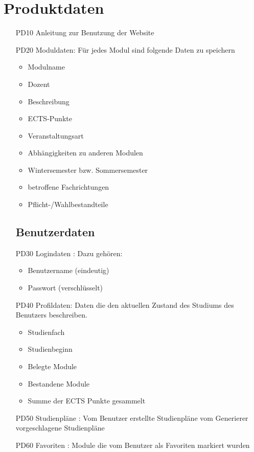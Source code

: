 \section{Produktdaten}
	\begin{itemize}[nosep]
	\subsection{Systemdaten}
	\item[PD10]Anleitung zur Benutzung der 		Website
	\item[PD20]Moduldaten: Für jedes Modul sind folgende Daten zu speichern	
	\begin{itemize}
	\item Modulname
	\item Dozent
	\item Beschreibung
	\item ECTS-Punkte
	\item Veranstaltungsart
	\item Abhängigkeiten zu anderen Modulen
	\item Wintersemester bzw. Sommersemester
	\item betroffene Fachrichtungen 
	\item Pflicht-/Wahlbestandteile
	\end{itemize}	 
	\subsection{Benutzerdaten}
	\item[PD30]Logindaten : Dazu gehören:
		\begin{itemize}
		\item Benutzername (eindeutig)
		\item Passwort (verschlüsselt)
		\end{itemize}
	\item[PD40]Profildaten: Daten die den aktuellen Zustand des Studiums des Benutzers beschreiben.
		\begin{itemize}
		\item Studienfach
		\item Studienbeginn
		\item Belegte Module
		\item Bestandene Module 
		\item Summe der ECTS Punkte gesammelt
		\end{itemize}
\item[PD50]Studienpläne : 
	Vom Benutzer erstellte Studienpläne 
	vom Generierer vorgeschlagene Studienpläne 
\item[PD60] Favoriten : Module die vom Benutzer als Favoriten markiert wurden
\end{itemize}